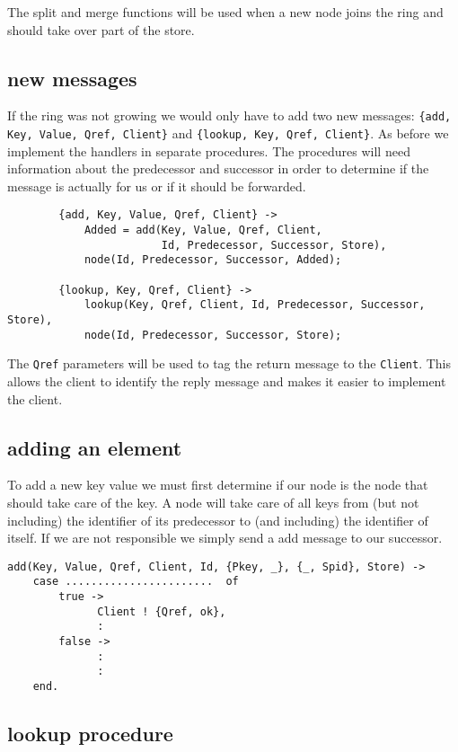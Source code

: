 \documentclass[a4paper,11pt]{article}
\begin{document}
The split and merge functions will be used when a new node joins the ring and should take over part of the store.

\subsection{new messages} 

If the ring was not growing we would only have to add two new
messages: {\tt \{add, Key, Value, Qref, Client\}} and {\tt \{lookup, Key, Qref,
  Client\}}. As before we implement the handlers in separate
procedures. The procedures will need information about the
predecessor and successor in order to determine if the message is
actually for us or if it should be forwarded.

\begin{verbatim}
        {add, Key, Value, Qref, Client} ->
            Added = add(Key, Value, Qref, Client, 
                        Id, Predecessor, Successor, Store),
            node(Id, Predecessor, Successor, Added);

        {lookup, Key, Qref, Client} ->
            lookup(Key, Qref, Client, Id, Predecessor, Successor, Store),
            node(Id, Predecessor, Successor, Store);
\end{verbatim}

The {\tt Qref} parameters will be used to tag the return message to the
{\tt Client}. This allows the client to identify the reply message and
makes it easier to implement the client.

\subsection{adding an element}

To add a new key value we must first determine if our node is the node
that should take care of the key. A node will take care of all keys
from (but not including) the identifier of its predecessor to (and
including) the identifier of itself. If we are not responsible we simply
send a add message to our successor.

\begin{verbatim}
add(Key, Value, Qref, Client, Id, {Pkey, _}, {_, Spid}, Store) ->
    case .......................  of
        true ->
              Client ! {Qref, ok},
              :
        false ->
              :
              :
    end.
\end{verbatim}

\subsection{lookup procedure}
\end{document}
